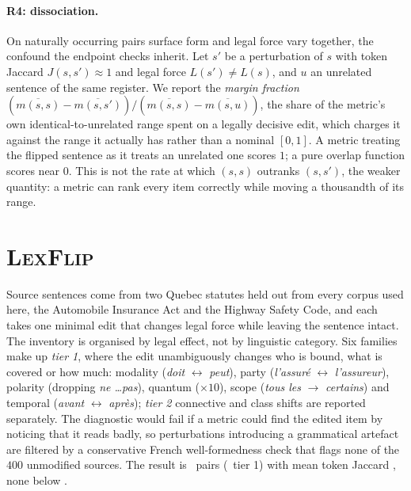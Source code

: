 \documentclass[11pt]{article}
\begin{document}
\paragraph{R4: dissociation.}
On naturally occurring pairs surface form and legal force vary together, the
confound the endpoint checks inherit. Let $s'$ be a perturbation of $s$ with
token Jaccard $J(s,s') \approx 1$ and legal force $L(s') \neq L(s)$, and $u$ an
unrelated sentence of the same register. We report the \emph{margin fraction}
$(\overline{m(s,s)} - \overline{m(s,s')}) /
 (\overline{m(s,s)} - \overline{m(s,u)})$, the share of the metric's own
identical-to-unrelated range spent on a legally decisive edit, which charges it
against the range it actually has rather than a nominal $[0,1]$. A metric
treating the flipped sentence as it treats an unrelated one scores $1$; a pure
overlap function scores near $0$. This is not the rate at which $(s,s)$ outranks
$(s,s')$, the weaker quantity: a metric can rank every item correctly while
moving a thousandth of its range.

\begin{table}[tb]\centering\footnotesize

\caption{\textsc{LexFlip}, min--max normalised per metric. \emph{discrim.} is
the share of items ranked correctly (identical $>$ edited), \emph{margin} the
fraction of the identical-to-unrelated range spent on the legal edit.}
\label{tab:challenge}
\end{table}

\section{\textsc{LexFlip}}
\label{sec:lexflip}

Source sentences come from two Quebec statutes held out from every corpus used
here, the Automobile Insurance Act and the Highway Safety Code, and
each takes one minimal edit that changes legal force while leaving the sentence
intact. The inventory is organised by legal effect, not by linguistic category.
Six families make up \emph{tier 1}, where the edit unambiguously changes who is
bound, what is covered or how much: modality (\emph{doit} $\leftrightarrow$
\emph{peut}), party (\emph{l'assur\'e} $\leftrightarrow$ \emph{l'assureur}),
polarity (dropping \emph{ne \dots pas}), quantum ($\times 10$), scope
(\emph{tous les} $\rightarrow$ \emph{certains}) and temporal (\emph{avant}
$\leftrightarrow$ \emph{apr\`es}); \emph{tier 2} connective and class shifts are
reported separately. The diagnostic would fail if a metric could find the edited
item by noticing that it reads badly, so perturbations introducing a grammatical
artefact are filtered by a conservative French well-formedness check that flags
none of the $400$ unmodified sources. The result is \numedits\ pairs
(\numeditsTierOne\ tier 1) with mean token Jaccard \meanjaccard, none below
\minjaccard.
\end{document}
